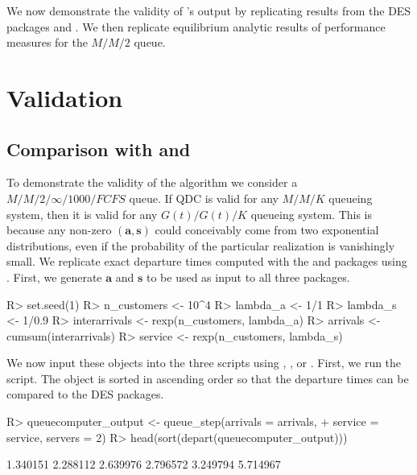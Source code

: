 \documentclass[article]{jss}
\begin{document}
We now demonstrate the validity of 's output by replicating results from the DES packages  and . We then replicate equilibrium analytic results of performance measures for the $M/M/2$ queue. 

\section{Validation} \label{sec:Validation}

\subsection[Comparison with simmer and simpy]{Comparison with
   and }

To demonstrate the validity of the algorithm we consider a
$M/M/2/\infty/1000/\mathit{FCFS}$ queue. If QDC is valid for any
$M/M/K$ queueing system, then it is valid for any $G(t)/G(t)/K$
queueing system. This is because any non-zero $\mathbf{(a,s)}$ could
conceivably come from two exponential distributions, even if the
probability of the particular realization is vanishingly small. We
replicate exact departure times computed with the  and
 packages using . First, we generate
$\mathbf{a}$ and $\mathbf{s}$ to be used as input to all three
packages.
%
\begin{CodeChunk}
\begin{CodeInput}
R> set.seed(1)
R> n_customers <- 10^4
R> lambda_a <- 1/1
R> lambda_s <- 1/0.9
R> interarrivals <- rexp(n_customers, lambda_a)
R> arrivals <- cumsum(interarrivals)
R> service <- rexp(n_customers, lambda_s)
\end{CodeInput}  
\end{CodeChunk}
%
We now input these objects into the three scripts using , , or . First, we run the  script. The  object is sorted in ascending order so that the departure times can be compared to the DES packages.
%
\begin{CodeChunk}
\begin{Sinput}
R> queuecomputer_output <- queue_step(arrivals = arrivals, 
+    service = service, servers = 2)
R> head(sort(depart(queuecomputer_output)))
\end{Sinput}
\begin{Soutput}
[1] 1.340151 2.288112 2.639976 2.796572 3.249794 5.714967
\end{Soutput}
\end{CodeChunk}
\end{document}
